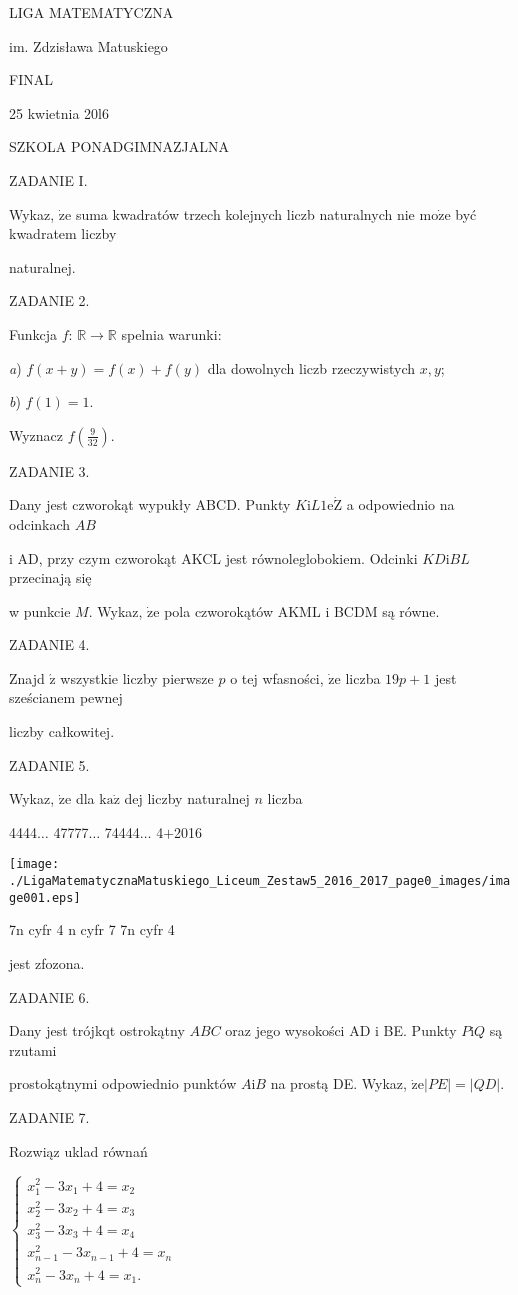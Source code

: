 \documentclass[a4paper,12pt]{article}
\begin{document}
LIGA MATEMATYCZNA

im. Zdzisława Matuskiego

FINAL

25 kwietnia 20l6

SZKOLA PONADGIMNAZJALNA

ZADANIE I.

Wykaz, $\dot{\mathrm{z}}\mathrm{e}$ suma kwadratów trzech kolejnych liczb naturalnych nie $\mathrm{m}\mathrm{o}\dot{\mathrm{z}}\mathrm{e}$ być kwadratem liczby

naturalnej.

ZADANIE 2.

Funkcja $f$: $\mathbb{R}\rightarrow \mathbb{R}$ spelnia warunki:

{\it a}) $f(x+y)=f(x)+f(y)$ dla dowolnych liczb rzeczywistych $x, y$;

{\it b}) $f(1)=1.$

Wyznacz $f(\displaystyle \frac{9}{32}).$

ZADANIE 3.

Dany jest czworokąt wypukły ABCD. Punkty $K \mathrm{i} L 1\mathrm{e}\dot{\mathrm{Z}}$ a odpowiednio na odcinkach $AB$

$\mathrm{i}$ AD, przy czym czworokąt AKCL jest równoleglobokiem. Odcinki $KD\mathrm{i}BL$ przecinają się

w punkcie $M$. Wykaz, $\dot{\mathrm{z}}\mathrm{e}$ pola czworokątów AKML $\mathrm{i}$ BCDM są równe.

ZADANIE 4.

Znajd $\acute{\mathrm{z}}$ wszystkie liczby pierwsze $p$ o tej wfasności, $\dot{\mathrm{z}}\mathrm{e}$ liczba $19p+1$ jest sześcianem pewnej

liczby całkowitej.

ZADANIE 5.

Wykaz, $\dot{\mathrm{z}}\mathrm{e}$ dla $\mathrm{k}\mathrm{a}\dot{\mathrm{z}}$ dej liczby naturalnej $n$ liczba

4444$\ldots$ 47777$\ldots$ 74444$\ldots$ 4$+$2016
\begin{center}
\texttt{[image: ./LigaMatematycznaMatuskiego\_Liceum\_Zestaw5\_2016\_2017\_page0\_images/image001.eps]}
\end{center}
7n cyfr 4 n cyfr 7  7n cyfr 4

jest zfozona.

ZADANIE 6.

Dany jest trójkqt ostrokątny $ABC$ oraz jego wysokości AD $\mathrm{i}$ BE. Punkty $P\mathrm{i}Q$ są rzutami

prostokątnymi odpowiednio punktów $A\mathrm{i}B$ na prostą DE. Wykaz, $\dot{\mathrm{z}}\mathrm{e}|PE|=|QD|.$

ZADANIE 7.

Rozwiąz uklad równań

$\left\{\begin{array}{l}
x_{1}^{2}-3x_{1}+4=x_{2}\\
x_{2}^{2}-3x_{2}+4=x_{3}\\
x_{3}^{2}-3x_{3}+4=x_{4}\\
x_{n-1}^{2}-3x_{n-1}+4=x_{n}\\
x_{n}^{2}-3x_{n}+4=x_{1}.
\end{array}\right.$
\end{document}
